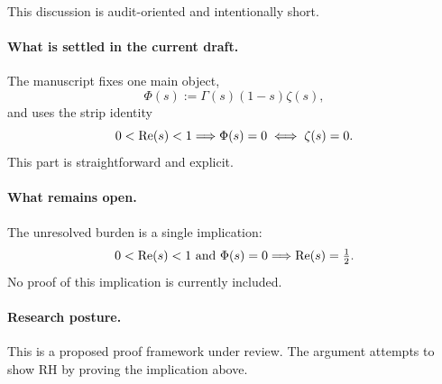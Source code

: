 This discussion is audit-oriented and intentionally short.

\paragraph{What is settled in the current draft.}
The manuscript fixes one main object,
\[
\Phi(s):=\Gamma(s)(1-s)\zeta(s),
\]
and uses the strip identity
\[
0<\operatorname{Re}(s)<1\Longrightarrow \Phi(s)=0\iff\zeta(s)=0.
\]
This part is straightforward and explicit.

\paragraph{What remains open.}
The unresolved burden is a single implication:
\[
0<\operatorname{Re}(s)<1\ \text{and}\ \Phi(s)=0
\Longrightarrow
\operatorname{Re}(s)=\tfrac12.
\]
No proof of this implication is currently included.

\paragraph{Research posture.}
This is a proposed proof framework under review.
The argument attempts to show RH by proving the implication above.
